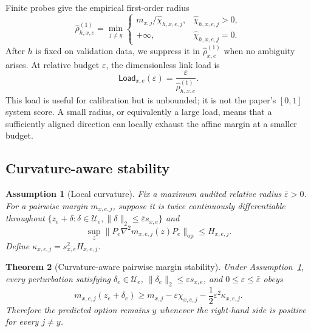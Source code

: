 \documentclass[11pt]{article}
\newtheorem{theorem}{Theorem}
\newtheorem{assumption}[theorem]{Assumption}
\newcommand{\eps}{\varepsilon}
\newcommand{\Load}{\mathsf{Load}}
\begin{document}
Finite probes give the empirical first-order radius
\begin{equation}
    \widehat\rho^{(1)}_{h,x,e}
    =
    \min_{j\ne y}
    \begin{cases}
    m_{x,j}/\widehat\chi_{h,x,e,j}, &
    \widehat\chi_{h,x,e,j}>0,\\
    +\infty, & \widehat\chi_{h,x,e,j}=0.
    \end{cases}
    \label{eq:empirical-radius}
\end{equation}
After \(h\) is fixed on validation data, we suppress it in
\(\widehat\rho^{(1)}_{x,e}\) when no ambiguity arises.
At relative budget $\eps$, the dimensionless link load is
\begin{equation}
    \Load_{x,e}(\eps)
    =
    \frac{\eps}{\widehat\rho^{(1)}_{h,x,e}}.
    \label{eq:load-ratio}
\end{equation}
This load is useful for calibration but is unbounded; it is not the paper's
\([0,1]\) system score. A small radius, or equivalently a large load, means
that a sufficiently aligned direction can locally exhaust the affine margin at
a smaller budget.

\subsection{Curvature-aware stability}

\begin{assumption}[Local curvature]
\label{ass:curvature}
Fix a maximum audited relative radius \(\bar\eps>0\). For a pairwise margin
$m_{x,e,j}$, suppose it is twice continuously differentiable throughout
\(\{z_e+\delta:\delta\in\mathcal U_e,
\|\delta\|_2\le\bar\eps s_{x,e}\}\) and
\begin{equation}
    \sup_z
    \|P_e\nabla^2 m_{x,e,j}(z)P_e\|_{\mathrm{op}}
    \le H_{x,e,j}.
\end{equation}
Define $\kappa_{x,e,j}=s_{x,e}^2H_{x,e,j}$.
\end{assumption}

\begin{theorem}[Curvature-aware pairwise margin stability]
\label{thm:margin-stability}
Under Assumption~\ref{ass:curvature}, every perturbation satisfying
$\delta_e\in\mathcal U_e$, $\|\delta_e\|_2\le\eps s_{x,e}$, and
\(0\le\eps\le\bar\eps\) obeys
\begin{equation}
    m_{x,e,j}(z_e+\delta_e)
    \ge
    m_{x,j}
    -\eps\chi_{x,e,j}
    -\frac{1}{2}\eps^2\kappa_{x,e,j}.
    \label{eq:curvature-bound}
\end{equation}
Therefore the predicted option remains $y$ whenever the right-hand side is
positive for every $j\ne y$.
\end{theorem}
\end{document}
